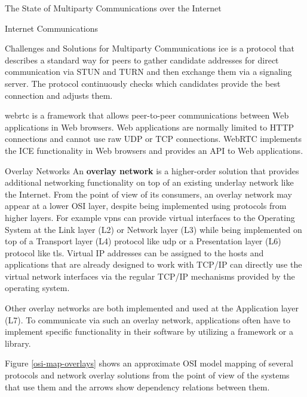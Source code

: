 \begin{frame}[fragile]{The State of Multiparty Communications over the
Internet}
\begin{block}{Internet Communications}
\begin{block}{Challenges and Solutions for Multiparty Communications}
\gls{ice} is a protocol that describes a standard way for peers to
gather candidate addresses for direct communication via STUN and TURN
and then exchange them via a signaling server. The protocol continuously
checks which candidates provide the best connection and adjusts them.

\gls{webrtc} is a framework that allows peer-to-peer communications
between Web applications in Web browsers. Web applications are normally
limited to HTTP connections and cannot use raw UDP or TCP connections.
WebRTC implements the ICE functionality in Web browsers and provides an
API to Web applications.

\end{block}
\end{block}

\begin{block}{Overlay Networks}
\protect\hypertarget{sec:overlays}{}
An \textbf{overlay network} is a higher-order solution that provides
additional networking functionality on top of an existing underlay
network like the Internet. From the point of view of its consumers, an
overlay network may appear at a lower OSI layer, despite being
implemented using protocols from higher layers. For example \glspl{vpn}
can provide virtual interfaces to the Operating System at the Link layer
(L2) or Network layer (L3) while being implemented on top of a Transport
layer (L4) protocol like \gls{udp} or a Presentation layer (L6) protocol
like \gls{tls}. Virtual IP addresses can be assigned to the hosts and
applications that are already designed to work with TCP/IP can directly
use the virtual network interfaces via the regular TCP/IP mechanisms
provided by the operating system.

Other overlay networks are both implemented and used at the Application
layer (L7). To communicate via such an overlay network, applications
often have to implement specific functionality in their software by
utilizing a framework or a library.

Figure \ref{osi-map-overlays} shows an approximate OSI model mapping of
several protocols and network overlay solutions from the point of view
of the systems that use them and the arrows show dependency relations
between them.


\end{block}
\end{frame}
